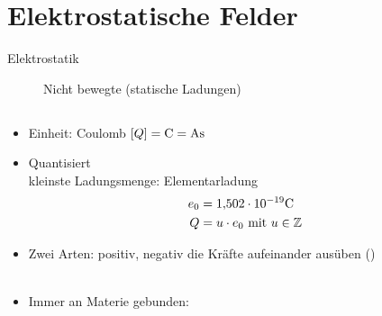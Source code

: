\chapter{Elektrostatische Felder}
\begin{description}
\item[Elektrostatik] Nicht bewegte (statische Ladungen)
\end{description}

\section{}
\begin{itemize}
\item Einheit: Coulomb $\ek{Q} = \unit{C} = \unit{As}$
\item Quantisiert\\
	kleinste Ladungsmenge: Elementarladung
	\begin{align*}
	e_0 &= 1{,}502 \mal 10^{-19} \unit{C}\\
	Q &= u \mal e_0 \tx{ mit } u \in \Z
	\end{align*}

\item Zwei Arten: positiv, negativ die Kräfte aufeinander ausüben ()\\
	\txtcirc{+}\txtcirc{+}  \txtcirc{-}\txtcirc{-} \\
	\txtcirc{+}\txtcirc{-}  \txtcirc{-}\txtcirc{+} 
\item Immer an Materie gebunden: 
\end{itemize}
